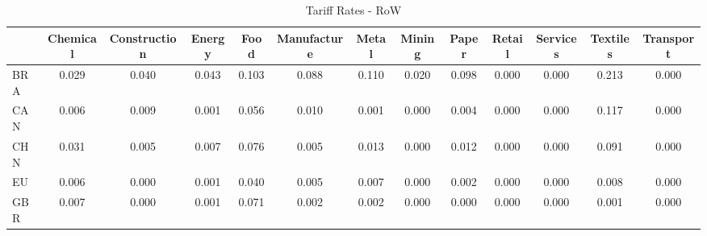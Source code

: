 \begin{table}[htbp]
\centering
\caption{Tariff Rates - RoW} 
\label{tab:tariffs_RoW}
\begin{tabular}{lcccccccccccc}
  \hline
 & Chemical & Construction & Energy & Food & Manufacture & Metal & Mining & Paper & Retail & Services & Textiles & Transport \\ 
  \hline
BRA & \textcolor[RGB]{72,47,183}{0.029} & \textcolor[RGB]{59,38,196}{0.040} & \textcolor[RGB]{57,37,198}{0.043} & \textcolor[RGB]{19,12,236}{0.103} & \textcolor[RGB]{28,18,227}{0.088} & \textcolor[RGB]{17,11,238}{0.110} & \textcolor[RGB]{81,52,174}{0.020} & \textcolor[RGB]{21,14,234}{0.098} & \textcolor[RGB]{255,165,0}{0.000} & \textcolor[RGB]{255,165,0}{0.000} & \textcolor[RGB]{2,1,253}{0.213} & \textcolor[RGB]{255,165,0}{0.000} \\ 
  CAN & \textcolor[RGB]{117,76,138}{0.006} & \textcolor[RGB]{104,67,151}{0.009} & \textcolor[RGB]{147,95,108}{0.001} & \textcolor[RGB]{51,33,204}{0.056} & \textcolor[RGB]{102,66,153}{0.010} & \textcolor[RGB]{142,92,113}{0.001} & \textcolor[RGB]{255,165,0}{0.000} & \textcolor[RGB]{128,82,128}{0.004} & \textcolor[RGB]{255,165,0}{0.000} & \textcolor[RGB]{255,165,0}{0.000} & \textcolor[RGB]{15,10,240}{0.117} & \textcolor[RGB]{255,165,0}{0.000} \\ 
  CHN & \textcolor[RGB]{70,45,185}{0.031} & \textcolor[RGB]{123,80,132}{0.005} & \textcolor[RGB]{113,73,142}{0.007} & \textcolor[RGB]{34,22,221}{0.076} & \textcolor[RGB]{119,77,136}{0.005} & \textcolor[RGB]{89,58,166}{0.013} & \textcolor[RGB]{255,165,0}{0.000} & \textcolor[RGB]{96,62,159}{0.012} & \textcolor[RGB]{255,165,0}{0.000} & \textcolor[RGB]{255,165,0}{0.000} & \textcolor[RGB]{25,16,230}{0.091} & \textcolor[RGB]{255,165,0}{0.000} \\ 
  EU & \textcolor[RGB]{115,74,140}{0.006} & \textcolor[RGB]{151,98,104}{0.000} & \textcolor[RGB]{142,92,113}{0.001} & \textcolor[RGB]{64,41,191}{0.040} & \textcolor[RGB]{119,77,136}{0.005} & \textcolor[RGB]{110,72,144}{0.007} & \textcolor[RGB]{255,165,0}{0.000} & \textcolor[RGB]{134,87,121}{0.002} & \textcolor[RGB]{255,165,0}{0.000} & \textcolor[RGB]{255,165,0}{0.000} & \textcolor[RGB]{106,69,149}{0.008} & \textcolor[RGB]{255,165,0}{0.000} \\ 
  GBR & \textcolor[RGB]{108,70,147}{0.007} & \textcolor[RGB]{255,165,0}{0.000} & \textcolor[RGB]{149,96,106}{0.001} & \textcolor[RGB]{40,26,215}{0.071} & \textcolor[RGB]{136,88,119}{0.002} & \textcolor[RGB]{138,89,117}{0.002} & \textcolor[RGB]{255,165,0}{0.000} & \textcolor[RGB]{255,165,0}{0.000} & \textcolor[RGB]{255,165,0}{0.000} & \textcolor[RGB]{255,165,0}{0.000} & \textcolor[RGB]{140,91,115}{0.001} & \textcolor[RGB]{255,165,0}{0.000} \\ 

\end{tabular}
\end{table}
